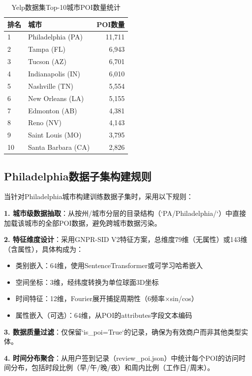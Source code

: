 \begin{table}[htbp]
\centering
\caption{Yelp数据集Top-10城市POI数量统计}
\label{tab:city_distribution}
\begin{tabular}{llr}
\toprule
排名 & 城市 & POI数量 \\
\midrule
1 & Philadelphia (PA) & 11,711 \\
2 & Tampa (FL) & 6,943 \\
3 & Tucson (AZ) & 6,701 \\
4 & Indianapolis (IN) & 6,010 \\
5 & Nashville (TN) & 5,554 \\
6 & New Orleans (LA) & 5,155 \\
7 & Edmonton (AB) & 4,381 \\
8 & Reno (NV) & 4,143 \\
9 & Saint Louis (MO) & 3,795 \\
10 & Santa Barbara (CA) & 2,826 \\
\bottomrule
\end{tabular}
\end{table}

\subsection{Philadelphia数据子集构建规则}
\label{sec:philly_data_rules}

当针对Philadelphia城市构建训练数据子集时，采用以下规则：

\textbf{1. 城市级数据抽取}：从按州/城市分层的目录结构（`PA/Philadelphia/`）中直接加载该城市的全部POI数据，避免跨城市数据污染。

\textbf{2. 特征维度设计}：采用GNPR-SID V2特征方案，总维度79维（无属性）或143维（含属性），具体构成为：
\begin{itemize}
    \item 类别嵌入：64维，使用SentenceTransformer或可学习哈希嵌入
    \item 空间坐标：3维，经纬度转换为单位球面3D坐标
    \item 时间特征：12维，Fourier展开捕捉周期性（6频率$\times$sin/cos）
    \item 属性嵌入（可选）：64维，从POI的attributes字段文本编码
\end{itemize}

\textbf{3. 数据质量过滤}：仅保留`is_poi=True`的记录，确保为有效商户而非其他类型实体。

\textbf{4. 时间分布聚合}：从用户签到记录（review_poi.json）中统计每个POI的访问时间分布，包括时段比例（早/午/晚/夜）和周内比例（工作日/周末）。


